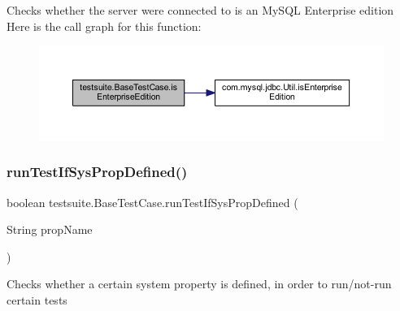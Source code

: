 Checks whether the server we\textquotesingle{}re connected to is an My\+S\+QL Enterprise edition Here is the call graph for this function\+:
\nopagebreak
\begin{figure}[H]
\begin{center}
\leavevmode
\includegraphics[width=350pt]{classtestsuite_1_1_base_test_case_ae29a3a848b87638921a7078f572b3f83_cgraph}
\end{center}
\end{figure}
\mbox{\label{classtestsuite_1_1_base_test_case_a3578b222700fc502212ce9834194ebaa}} 
\subsubsection{\texorpdfstring{run\+Test\+If\+Sys\+Prop\+Defined()}{runTestIfSysPropDefined()}}
{\footnotesize\ttfamily boolean testsuite.\+Base\+Test\+Case.\+run\+Test\+If\+Sys\+Prop\+Defined (\begin{DoxyParamCaption}\item[{String}]{prop\+Name }\end{DoxyParamCaption})\hspace{0.3cm}{\ttfamily [protected]}}

Checks whether a certain system property is defined, in order to run/not-\/run certain tests


